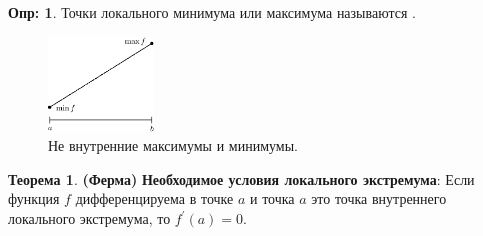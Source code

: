 \documentclass[12pt]{article}
\theoremstyle{definition}
\newtheorem{defn}{Опр:}
\newtheorem{theorem}{Теорема}
\begin{document}
\begin{defn}
	Точки локального минимума или максимума называются .
\end{defn}

\begin{figure}[H]
	\centering
	\includegraphics[width=0.25\textwidth]{26_3.eps}
	\caption{Не внутренние максимумы и минимумы.}
	\label{26_3}
\end{figure}

\begin{theorem}\textbf{(Ферма)} \textbf{Необходимое условия локального экстремума}:
	Если функция $f$ дифференцируема в точке $a$ и точка $a$ это точка внутреннего локального экстремума, то $f^\prime(a) = 0$.
\end{theorem}
\end{document}
